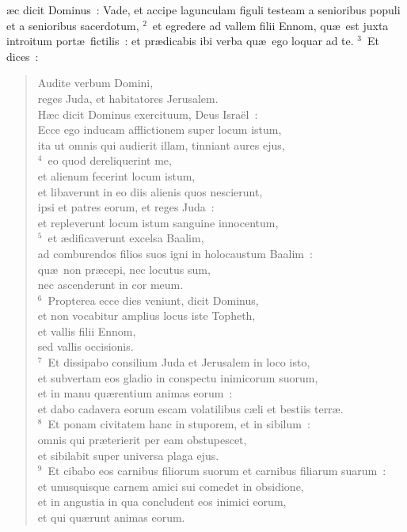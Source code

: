 \bchapter
{}\ae c dicit Dominus~: Vade, et accipe lagunculam figuli testeam a senioribus populi et a senioribus sacerdotum,
${}^{2}$~et egredere ad vallem filii Ennom, qu\ae\ est juxta introitum port\ae\ fictilis~: et pr\ae dicabis ibi verba qu\ae\ ego loquar ad te.
${}^{3}$~Et dices~: \begin{flushleft}\begin{verse}Audite verbum Domini,\\ reges Juda, et habitatores Jerusalem.\\ H\ae c dicit Dominus exercituum, Deus Isra\"el~:\\ Ecce ego inducam afflictionem super locum istum,\\ ita ut omnis qui audierit illam, tinniant aures ejus,\\
${}^{4}$~eo quod dereliquerint me,\\ et alienum fecerint locum istum,\\ et libaverunt in eo diis alienis quos nescierunt,\\ ipsi et patres eorum, et reges Juda~:\\ et repleverunt locum istum sanguine innocentum,\\
${}^{5}$~et \ae dificaverunt excelsa Baalim,\\ ad comburendos filios suos igni in holocaustum Baalim~:\\ qu\ae\ non pr\ae cepi, nec locutus sum,\\ nec ascenderunt in cor meum.\\
${}^{6}$~Propterea ecce dies veniunt, dicit Dominus,\\ et non vocabitur amplius locus iste Topheth,\\ et vallis filii Ennom,\\ sed vallis occisionis.\\
${}^{7}$~Et dissipabo consilium Juda et Jerusalem in loco isto,\\ et subvertam eos gladio in conspectu inimicorum suorum,\\ et in manu qu\ae rentium animas eorum~:\\ et dabo cadavera eorum escam volatilibus c\ae li et bestiis terr\ae .\\
${}^{8}$~Et ponam civitatem hanc in stuporem, et in sibilum~:\\ omnis qui pr\ae terierit per eam obstupescet,\\ et sibilabit super universa plaga ejus.\\
${}^{9}$~Et cibabo eos carnibus filiorum suorum et carnibus filiarum suarum~:\\ et unusquisque carnem amici sui comedet in obsidione,\\ et in angustia in qua concludent eos inimici eorum,\\ et qui qu\ae runt animas eorum.\end{verse}\end{flushleft}


